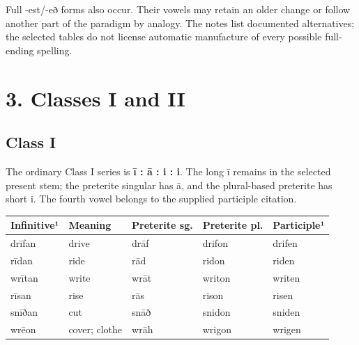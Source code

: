 Full -est/\allowbreak{}-eð forms also occur. Their vowels may retain an older change or follow another part of the paradigm by analogy. The notes list documented alternatives; the selected tables do not license automatic manufacture of every possible full-ending spelling.

\section*{3. Classes I and II}

\subsection*{Class I}

The ordinary Class I series is \textbf{ī : ā : i : i}. The long ī remains in the selected present stem; the preterite singular has ā, and the plural-based preterite has short i. The fourth vowel belongs to the supplied participle citation.

\par\begingroup
\fontsize{10.5}{13.2}\selectfont
\setlength{\LTleft}{0pt}\setlength{\LTright}{\fill}
\noindent
\begin{tabular}{@{}>{\raggedright\arraybackslash}p{23.14mm}>{\raggedright\arraybackslash}p{21.04mm}>{\raggedright\arraybackslash}p{22.72mm}>{\raggedright\arraybackslash}p{22.72mm}>{\raggedright\arraybackslash}p{23.14mm}@{}}
\toprule
\textbf{Infinitive¹} & \textbf{Meaning} & \textbf{Preterite sg.} & \textbf{Preterite pl.} & \textbf{Participle¹} \\
\midrule
drīfan & drive & drāf & drifon & drifen \\
rīdan & ride & rād & ridon & riden \\
wrītan & write & wrāt & writon & writen \\
rīsan & rise & rās & rison & risen \\
snīðan & cut & snāð & snidon & sniden \\
wrēon & cover; clothe & wrāh & wrigon & wrigen \\
\bottomrule
\end{tabular}
\par\endgroup

